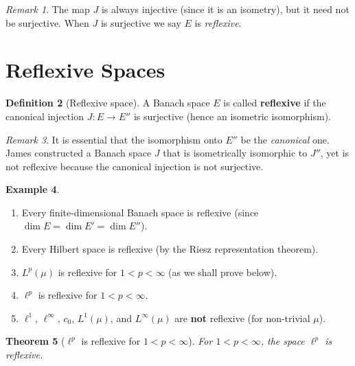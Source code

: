 \documentclass[a4paper,12pt]{book}
\theoremstyle{definition}
\newtheorem{definition}{Definition}[chapter]
\newtheorem{example}[definition]{Example}
\theoremstyle{plain}
\newtheorem{theorem}[definition]{Theorem}
\theoremstyle{remark}
\newtheorem{remark}[definition]{Remark}
\begin{document}
\begin{remark}\label{rem:J-not-surjective}
The map $J$ is always injective (since it is an isometry), but it need not be
surjective.  When $J$ is surjective we say $E$ is \emph{reflexive}.
\end{remark}

\section{Reflexive Spaces}\label{sec:reflexive}

\begin{definition}[Reflexive space]\label{def:reflexive}
A Banach space $E$ is called \textbf{reflexive} if the canonical injection
$J:E\to E''$ is surjective (hence an isometric isomorphism).
\end{definition}

\begin{remark}\label{rem:reflexive-isometric}
It is essential that the isomorphism onto $E''$ be the \emph{canonical} one.
James constructed a Banach space $J$ that is isometrically isomorphic to $J''$,
yet is not reflexive because the canonical injection is not surjective.
\end{remark}

\begin{example}\label{ex:reflexive-examples}
\leavevmode
\begin{enumerate}[label=(\roman*)]
  \item Every finite-dimensional Banach space is reflexive (since $\dim E = \dim E' = \dim E''$).
  \item Every Hilbert space is reflexive (by the Riesz representation theorem).
  \item $L^p(\mu)$ is reflexive for $1 < p < \infty$ (as we shall prove below).
  \item $\ell^p$ is reflexive for $1 < p < \infty$.
  \item $\ell^1$, $\ell^\infty$, $c_0$, $L^1(\mu)$, and $L^\infty(\mu)$ are
        \textbf{not} reflexive (for non-trivial $\mu$).
\end{enumerate}
\end{example}

\begin{theorem}[$\ell^p$ is reflexive for $1<p<\infty$]\label{thm:lp-reflexive}
For $1<p<\infty$, the space $\ell^p$ is reflexive.
\end{theorem}
\end{document}
